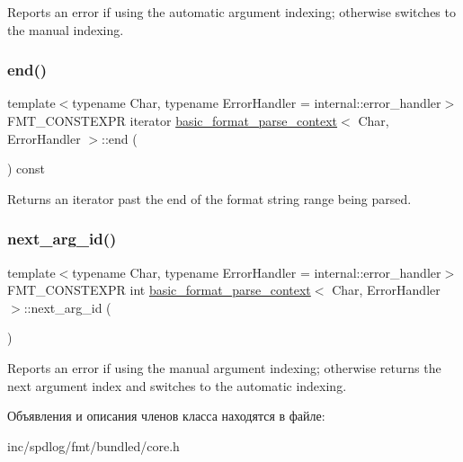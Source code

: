 Reports an error if using the automatic argument indexing; otherwise switches to the manual indexing. \mbox{\label{classbasic__format__parse__context_a02391d628854caf8c3416f21dec43b46}} 
\subsubsection{\texorpdfstring{end()}{end()}}
{\footnotesize\ttfamily template$<$typename Char, typename Error\+Handler = internal\+::error\+\_\+handler$>$ \\
F\+M\+T\+\_\+\+C\+O\+N\+S\+T\+E\+X\+PR iterator \hyperlink{classbasic__format__parse__context}{basic\+\_\+format\+\_\+parse\+\_\+context}$<$ Char, Error\+Handler $>$\+::end (\begin{DoxyParamCaption}{ }\end{DoxyParamCaption}) const\hspace{0.3cm}{\ttfamily [inline]}}

Returns an iterator past the end of the format string range being parsed. \mbox{\label{classbasic__format__parse__context_a75c83556b48d6b5ee7b4866296888727}} 
\subsubsection{\texorpdfstring{next\+\_\+arg\+\_\+id()}{next\_arg\_id()}}
{\footnotesize\ttfamily template$<$typename Char, typename Error\+Handler = internal\+::error\+\_\+handler$>$ \\
F\+M\+T\+\_\+\+C\+O\+N\+S\+T\+E\+X\+PR int \hyperlink{classbasic__format__parse__context}{basic\+\_\+format\+\_\+parse\+\_\+context}$<$ Char, Error\+Handler $>$\+::next\+\_\+arg\+\_\+id (\begin{DoxyParamCaption}{ }\end{DoxyParamCaption})\hspace{0.3cm}{\ttfamily [inline]}}

Reports an error if using the manual argument indexing; otherwise returns the next argument index and switches to the automatic indexing. 

Объявления и описания членов класса находятся в файле\+:\begin{DoxyCompactItemize}
\item 
inc/spdlog/fmt/bundled/core.\+h\end{DoxyCompactItemize}
